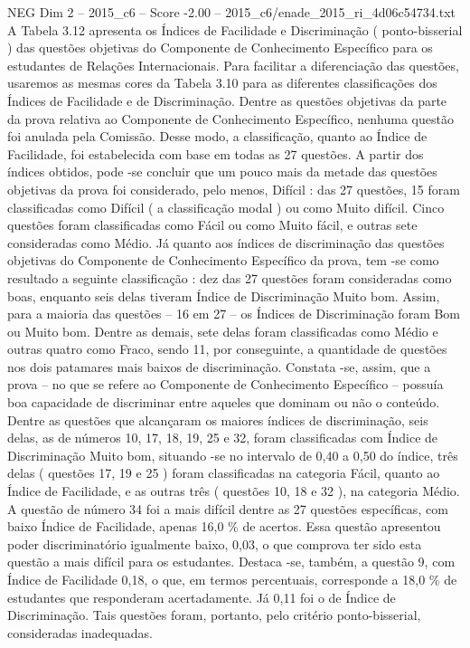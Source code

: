 \begin{textsample}{NEG Dim 2 – 2015\_c6 – Score -2.00 – 2015\_c6/enade\_2015\_ri\_4d06c54734.txt}
A Tabela 3.12 apresenta os Índices de Facilidade e Discriminação ( ponto-bisserial ) das questões objetivas do Componente de Conhecimento Específico para os estudantes de Relações Internacionais.
Para facilitar a diferenciação das questões, usaremos as mesmas cores da Tabela 3.10 para as diferentes classificações dos Índices de Facilidade e de Discriminação.
Dentre as questões objetivas da parte da prova relativa ao Componente de Conhecimento Específico, nenhuma questão foi anulada pela Comissão.
Desse modo, a classificação, quanto ao Índice de Facilidade, foi estabelecida com base em todas as 27 questões.
A partir dos índices obtidos, pode -se concluir que um pouco mais da metade das questões objetivas da prova foi considerado, pelo menos, Difícil : das 27 questões, 15 foram classificadas como Difícil ( a classificação modal ) ou como Muito difícil.
Cinco questões foram classificadas como Fácil ou como Muito fácil, e outras sete consideradas como Médio.
Já quanto aos índices de discriminação das questões objetivas do Componente de Conhecimento Específico da prova, tem -se como resultado a seguinte classificação : dez das 27 questões foram consideradas como boas, enquanto seis delas tiveram Índice de Discriminação Muito bom.
Assim, para a maioria das questões – 16 em 27 – os Índices de Discriminação foram Bom ou Muito bom.
Dentre as demais, sete delas foram classificadas como Médio e outras quatro como Fraco, sendo 11, por conseguinte, a quantidade de questões nos dois patamares mais baixos de discriminação.
Constata -se, assim, que a prova – no que se refere ao Componente de Conhecimento Específico – possuía boa capacidade de discriminar entre aqueles que dominam ou não o conteúdo.
Dentre as questões que alcançaram os maiores índices de discriminação, seis delas, as de números 10, 17, 18, 19, 25 e 32, foram classificadas com Índice de Discriminação Muito bom, situando -se no intervalo de 0,40 a 0,50 do índice, três delas ( questões 17, 19 e 25 ) foram classificadas na categoria Fácil, quanto ao Índice de Facilidade, e as outras três ( questões 10, 18 e 32 ), na categoria Médio.
A questão de número 34 foi a mais difícil dentre as 27 questões específicas, com baixo Índice de Facilidade, apenas 16,0 \% de acertos.
Essa questão apresentou poder discriminatório igualmente baixo, 0,03, o que comprova ter sido esta questão a mais difícil para os estudantes.
Destaca -se, também, a questão 9, com Índice de Facilidade 0,18, o que, em termos percentuais, corresponde a 18,0 \% de estudantes que responderam acertadamente.
Já 0,11 foi o de Índice de Discriminação.
Tais questões foram, portanto, pelo critério ponto-bisserial, consideradas inadequadas.

\end{textsample}
